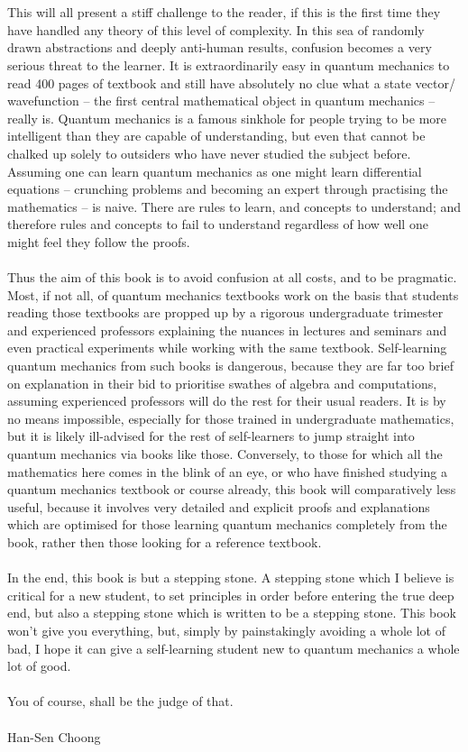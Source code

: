 \\\\
This will all present a stiff challenge to the reader, if this is the first time they have handled any theory of this level of complexity. In this sea of randomly drawn abstractions and deeply anti-human results, confusion becomes a very serious threat to the learner. It is extraordinarily easy in quantum mechanics to read 400 pages of textbook and still have absolutely no clue what a state vector/ wavefunction -- the first central mathematical object in quantum mechanics -- really is. Quantum mechanics is a famous sinkhole for people trying to be more intelligent than they are capable of understanding, but even that cannot be chalked up solely to outsiders who have never studied the subject before. Assuming one can learn quantum mechanics as one might learn differential equations -- crunching problems and becoming an expert through practising the mathematics -- is naive. There are rules to learn, and concepts to understand; and therefore rules and concepts to fail to understand regardless of how well one might feel they follow the proofs.
\\\\
Thus the aim of this book is to avoid confusion at all costs, and to be pragmatic. Most, if not all, of quantum mechanics textbooks work on the basis that students reading those textbooks are propped up by a rigorous undergraduate trimester and experienced professors explaining the nuances in lectures and seminars and even practical experiments while working with the same textbook. Self-learning quantum mechanics from such books is dangerous, because they are far too brief on explanation in their bid to prioritise swathes of algebra and computations, assuming experienced professors will do the rest for their usual readers. It is by no means impossible, especially for those trained in undergraduate mathematics, but it is likely ill-advised for the rest of self-learners to jump straight into quantum mechanics via books like those. Conversely, to those for which all the mathematics here comes in the blink of an eye, or who have finished studying a quantum mechanics textbook or course already, this book will comparatively less useful, because it involves very detailed and explicit proofs and explanations which are optimised for those learning quantum mechanics completely from the book, rather then those looking for a reference textbook.
\\\\
In the end, this book is but a stepping stone. A stepping stone which I believe is critical for a new student, to set principles in order before entering the true deep end, but also a stepping stone which is written to be a stepping stone. This book won't give you everything, but, simply by painstakingly avoiding a whole lot of bad, I hope it can give a self-learning student new to quantum mechanics a whole lot of good.
\\\\
You of course, shall be the judge of that.
\\\\
Han-Sen Choong
